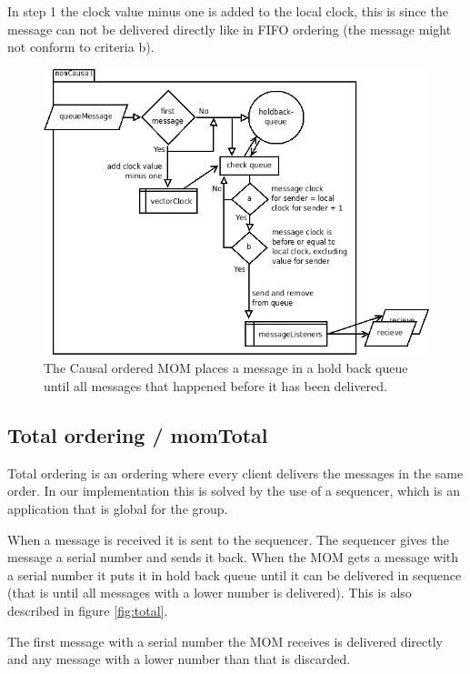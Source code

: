 \documentclass[english]{article}
\begin{document}
In step 1 the clock value minus one is added to the local clock, this is since the message can not be delivered directly like in FIFO ordering (the message might not conform to criteria b). 

\begin{figure}
\includegraphics[width=\textwidth]{momCausal.png}
\caption{The Causal ordered MOM places a message in a hold back queue until all messages that happened before it has been delivered.}
\label{fig:causal}
\end{figure}

\subsection{Total ordering / momTotal}
\label{mo-total}
Total ordering is an ordering where every client delivers the messages in the same order. In our implementation this is solved by the use of a sequencer, which is an application that is global for the group. 

When a message is received it is sent to the sequencer. The sequencer gives the message a serial number and sends it back. When the MOM gets a message with a serial number it puts it in hold back queue until it can be delivered in sequence (that is until all messages with a lower number is delivered). This is also described in figure \vref{fig:total}.

The first message with a serial number the MOM receives is delivered directly and any message with a lower number than that is discarded.
\end{document}
